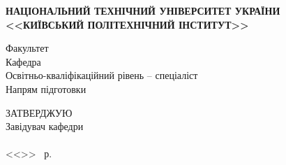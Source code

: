 \documentclass[main.tex]{subfiles}
\begin{document}

\newcommand\ufullline{\uline{\hfill\mbox{}}}

\begin{specialpage}
  \MakeUppercase{\textbf{національний технічний університет України}}\\
  \MakeUppercase{\textbf{<<Київський Політехнічний Інститут>>}}\\
  \begin{flushleft}
    Факультет \ufullline\\
    Кафедра \ufullline\\
    Освітньо-кваліфікаційний рівень -- спеціаліст\\
    Напрям підготовки \uline{\hfill\mbox{}}
  \end{flushleft}

  \vspace{1cm}

  \hfill\begin{minipage}{0.35\linewidth}
  \begin{flushleft}
      ЗАТВЕРДЖУЮ\\
      Завідувач кафедри\\
      \fillin[(підпис)]{\hspace{2.2cm}} \\
      <<\fillin{\phantom{99}}>>\fillin{\hspace{3cm}} ~р.
  \end{flushleft}
  \end{minipage}

  \vspace{1cm}


\end{specialpage}
\end{document}
